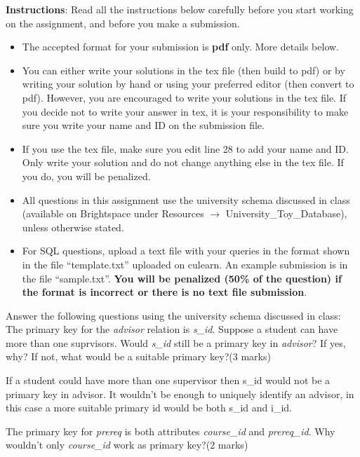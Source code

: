 \documentclass[a4 paper]{article}
\begin{document}
\textbf{Instructions}: Read all the instructions below carefully before you start working on the assignment, and before you make a submission.
\begin{itemize}
    \item The accepted format for your submission is \textbf{pdf} only. More details below. 
    \item You can either write your solutions in the tex file (then build to pdf) or by writing your solution by hand or using your preferred editor (then convert to pdf). However, you are encouraged to write your solutions in the tex file. If you decide not to write your answer in tex, it is your responsibility to make sure you write your name and ID on the submission file.
    \item If you use the tex file, make sure you edit line 28 to add your name and ID. Only write your solution and do not change anything else in the tex file. If you do, you will be penalized.
    \item All questions in this assignment use the university schema discussed in class (available on Brightspace under Resources $\rightarrow$ University\_Toy\_Database), unless otherwise stated.
    \item For SQL questions, upload a text file with your queries in the format shown in the file ``template.txt'' uploaded on culearn. An example submission is in the file ``sample.txt''. \textbf{You will be penalized (50\% of the question) if the format is incorrect or there is no text file submission}. 
\end{itemize}


Answer the following questions using the university schema discussed in class: 
 The primary key for the \emph{advisor} relation is \emph{s\_id}. Suppose a student can have more than one suprvisors. Would \emph{s\_id} still be a primary key in \emph{advisor}? If yes, why? If not, what would be a suitable primary key?\indent (3 marks)

If a student could have more than one supervisor then s\_id would not be a primary key in advisor.
It wouldn't be enough to uniquely identify an advisor, in this case a more suitable primary id would be both s\_id and i\_id.

 The primary key for \emph{prereq} is both attributes \emph{course\_id} and \emph{prereq\_id}. Why wouldn't only \emph{course\_id} work as primary key?\indent (2 marks)\\
\end{document}
